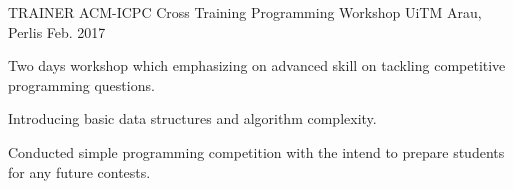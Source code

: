 \begin{cventries}
  \cventry
    {TRAINER}
    {ACM-ICPC Cross Training Programming Workshop}
    {UiTM Arau, Perlis}
    {Feb. 2017}
    {
      \begin{cvitems}
        \item {Two days workshop which emphasizing on advanced skill on tackling competitive programming questions.}
        \item {Introducing basic data structures and algorithm complexity.}
        \item {Conducted simple programming competition with the intend to prepare students for any future contests.}
      \end{cvitems}
    }

\end{cventries}
